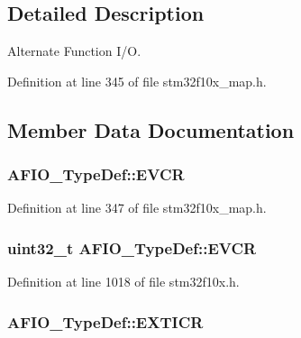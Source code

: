 \subsection{Detailed Description}
Alternate Function I/O. 

Definition at line 345 of file stm32f10x\+\_\+map.\+h.



\subsection{Member Data Documentation}
\subsubsection[{\texorpdfstring{E\+V\+CR}{EVCR}}]{ A\+F\+I\+O\+\_\+\+Type\+Def\+::\+E\+V\+CR}\hypertarget{struct_a_f_i_o___type_def_aa7a164e76ffcc803a5e0985a87a2590e}{}\label{struct_a_f_i_o___type_def_aa7a164e76ffcc803a5e0985a87a2590e}


Definition at line 347 of file stm32f10x\+\_\+map.\+h.

\subsubsection[{\texorpdfstring{E\+V\+CR}{EVCR}}]{ {\bf uint32\+\_\+t} A\+F\+I\+O\+\_\+\+Type\+Def\+::\+E\+V\+CR}\hypertarget{struct_a_f_i_o___type_def_a377d5227cd20950e4489cd04df16500f}{}\label{struct_a_f_i_o___type_def_a377d5227cd20950e4489cd04df16500f}


Definition at line 1018 of file stm32f10x.\+h.

\subsubsection[{\texorpdfstring{E\+X\+T\+I\+CR}{EXTICR}}]{ A\+F\+I\+O\+\_\+\+Type\+Def\+::\+E\+X\+T\+I\+CR}\hypertarget{struct_a_f_i_o___type_def_aa4f8d7d5d976a55acbe9544de4300f8d}{}\label{struct_a_f_i_o___type_def_aa4f8d7d5d976a55acbe9544de4300f8d}



